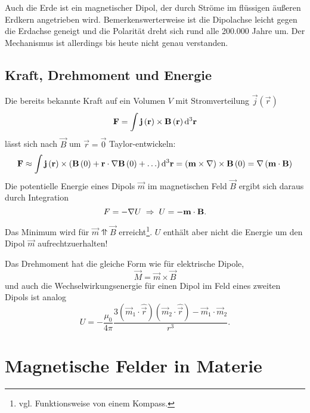 Auch die Erde ist ein magnetischer Dipol, der durch Ströme im flüssigen äußeren Erdkern angetrieben wird. Bemerkenswerterweise ist die Dipolachse leicht gegen die Erdachse geneigt und die Polarität dreht sich rund alle 200.000 Jahre um. Der Mechanismus ist allerdings bis heute nicht genau verstanden.

\subsection{Kraft, Drehmoment und Energie}

Die bereits bekannte Kraft auf ein Volumen $V$ mit Stromverteilung $\vec {j}\left(\vec {r}\right)$
\begin{equation*}
	\mathbf{F}=\int \mathbf{j}\left(\mathbf{r}\right)\times \mathbf{B}\left(\mathbf{r}\right)\mathop{}\!\mathrm{d} ^{3}\mathbf{r}
\end{equation*}
lässt sich nach $\vec {B}$ um $\vec {r}=\vec {0}$ Taylor-entwickeln:
\begin{equation*}
	\mathbf{F}\approx \int \mathbf{j}\left(\mathbf{r}\right)\times \left(\mathbf{B}\left(0\right)+\mathbf{r}\cdot \nabla \mathbf{B}\left(0\right)+\ldots \right)\mathop{}\!\mathrm{d} ^{3}\mathbf{r}=\left(\mathbf{m}\times \nabla \right)\times \mathbf{B}\left(0\right)=\nabla \left(\mathbf{m}\cdot \mathbf{B}\right)
\end{equation*}
Die potentielle Energie eines Dipols $\vec {m}$ im magnetischen Feld $\vec {B}$ ergibt sich daraus durch Integration
\begin{equation*}
	F=-\nabla U\;\Rightarrow\; U=-\mathbf{m}\cdot \mathbf{B}.
\end{equation*}

Das Minimum wird für $\vec {m} \upupharpoons \vec {B}$ erreicht\footnote{vgl. Funktionsweise von einem Kompass. }. $U$ enthält aber nicht die Energie um den Dipol $\vec {m}$ aufrechtzuerhalten!

Das Drehmoment hat die gleiche Form wie für elektrische Dipole,
\begin{equation*}
	\vec {M}=\vec {m}\times \vec {B}
\end{equation*}
und auch die Wechselwirkungsenergie für einen Dipol im Feld eines zweiten Dipols ist analog
\begin{equation*}
	U=-\frac{\mu _{0}}{4\pi }\frac{3\left(\vec {m}_{1}\cdot \hat{\vec {r}}\right)\left(\vec {m}_{2}\cdot \hat{\vec {r}}\right)-\vec {m}_{1}\cdot \vec {m}_{2}}{r^{3}}.
\end{equation*}



\section{Magnetische Felder in Materie}

